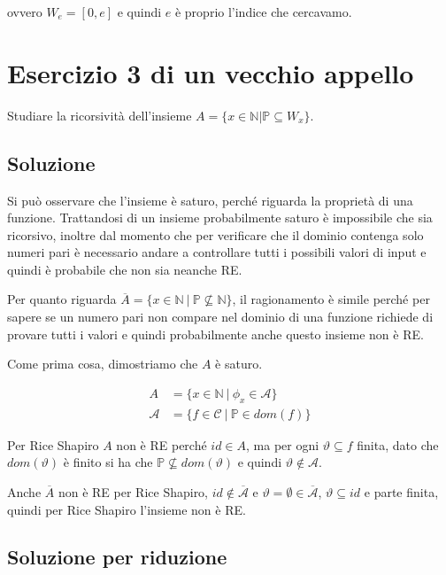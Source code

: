 ovvero $W_e = [0,e]$ e quindi $e$ è proprio l'indice che cercavamo.

\section{Esercizio 3 di un vecchio appello}
 
 Studiare la ricorsività dell'insieme $A = \{ x \in \mathbb{N} | \mathbb{P} \subseteq W_x \}$.
 
 \subsection{Soluzione}
 
 Si può osservare che l'insieme è saturo, perché riguarda la proprietà di una funzione. Trattandosi di un insieme probabilmente saturo è impossibile che sia ricorsivo, inoltre dal momento che per verificare che il dominio contenga solo numeri pari è necessario andare a controllare tutti i possibili valori di input e quindi è probabile che non sia neanche RE.
 
 Per quanto riguarda $\overline{A} = \{ x \in \mathbb{N} \: | \: \mathbb{P} \nsubseteq \mathbb{N}\}$, il ragionamento è simile perché per sapere se un numero pari non compare nel dominio di una funzione richiede di provare tutti i valori e quindi probabilmente anche questo insieme non è RE.
 
 Come prima cosa, dimostriamo che $A$ è saturo.
 
\begin{align*}
 A &= \{ x \in \mathbb{N} \:|\: \phi_x \in \mathcal{A}\} \\
 \mathcal{A} &= \{ f \in \mathcal{C} \:|\: \mathbb{P} \in dom(f) \}
\end{align*}

Per Rice Shapiro $A$ non è RE perché $id \in A$, ma per ogni $\vartheta \subseteq f$ finita, dato che $dom(\vartheta)$ è finito si ha che $\mathbb{P} \nsubseteq dom(\vartheta)$ e quindi $\vartheta \notin \mathcal{A}$.

Anche $\overline{A}$ non è RE per Rice Shapiro, $id \notin \overline{\mathcal{A}}$ e $\vartheta = \emptyset \in  \overline{\mathcal{A}}$, $\vartheta \subseteq id$ e parte finita, quindi per Rice Shapiro l'insieme non è RE.

\subsection{Soluzione per riduzione}

